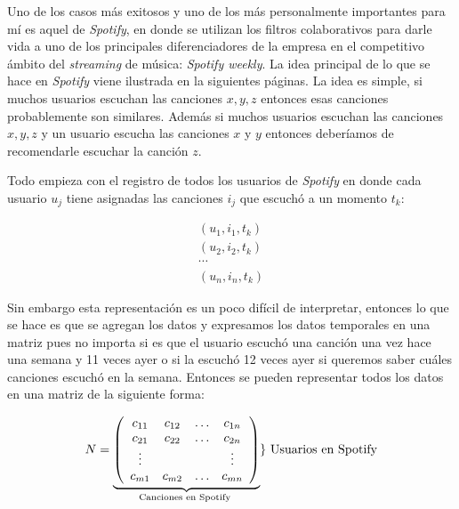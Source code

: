 Uno de los casos más exitosos y uno de los más personalmente importantes para mí es aquel de \textit{Spotify}, en donde se utilizan los filtros colaborativos para darle vida a uno de los principales diferenciadores de la empresa en el competitivo ámbito del \textit{streaming} de música: \textit{Spotify weekly}. La idea principal de lo que se hace en \textit{Spotify} viene ilustrada en la siguientes páginas. La idea es simple, si muchos usuarios escuchan las canciones $x,y,z$ entonces esas canciones probablemente son similares. Además si muchos usuarios escuchan las canciones $x,y,z$ y un usuario escucha las canciones $x$ y $y$ entonces deberíamos de recomendarle escuchar la canción $z$.

Todo empieza con el registro de todos los usuarios de \textit{Spotify} en donde cada usuario $u_j$ tiene asignadas las canciones $i_j$ que escuchó a un momento $t_k$:

$$\begin{array} { l } { \left( u _ { 1 } , i _ { 1 } , t _ { k } \right) } \\ { \left( u _ { 2 } , i _ { 2 } , t _ { k } \right) } \\ { \cdots } \\ { \left( u _ { n } , i _ { n } , t _ { k } \right) } \end{array}$$

Sin embargo esta representación es un poco difícil de interpretar, entonces lo que se hace es que se agregan los datos y expresamos los datos temporales en una matriz pues no importa si es que el usuario escuchó una canción una vez hace una semana y 11 veces ayer o si la escuchó 12 veces ayer si queremos saber cuáles canciones escuchó en la semana. Entonces se pueden representar todos los datos en una matriz de la siguiente forma:


$$N = \underbrace { \left( \begin{array} { c c c c } { c _ { 11 } } & { c _ { 12 } } & { \dots } & { c _ { 1 n } } \\ { c _ { 21 } } & { c _ { 22 } } & { \dots } & { c _ { 2 n } } \\ { \vdots } & { } & { } & { \vdots } \\ { c _ { m 1 } } & { c _ { m 2 } } & { \dots } & { c _ { m n } } \end{array} \right) } _ { \text {Canciones en Spotify } } \} \text { Usuarios en Spotify}$$



